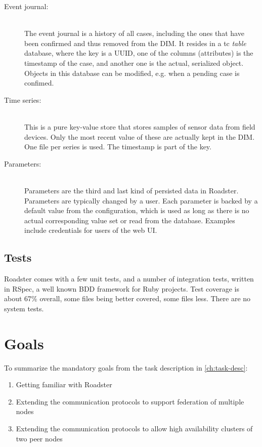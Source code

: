 \begin{description}
	\item [ Event journal: ] \hfill\\
		The event journal is a history of all \glspl{case}, including the ones
		that have been confirmed and thus removed from the DIM. It
		resides in a \gls{tc} \emph{table} database, where the key is a
		\acrshort{UUID}, one of the columns (attributes) is the timestamp of
		the case, and another one is the actual, serialized 
		object. Objects in this database can be modified, e.g. when a
		pending case is confimed.

	\item [ Time series: ] \hfill\\
		This is a pure key-value store that stores samples of sensor
		data from field devices. Only the most recent value of these
		are actually kept in the DIM. One file per series is used. The
		timestamp is part of the key.

	\item [ Parameters: ] \hfill\\
		Parameters are the third and last kind of persisted data in
		Roadster. Parameters are typically changed by a user. Each
		parameter is backed by a default value from the configuration,
		which is used as long as there is no actual corresponding value
		set or read from the database. Examples include credentials for
		users of the web UI.
\end{description}


\subsection{Tests}
Roadster comes with a few unit tests, and a number of integration tests,
written in RSpec, a well known \gls{BDD} framework for Ruby projects. Test coverage is
about 67\% overall, some files being better covered, some files less. There are
no system tests.

\section{Goals}\label{sec:scope:goals}
To summarize the mandatory goals from the task description in \autoref{ch:task-desc}:

\begin{enumerate}
	\item Getting familiar with Roadster
	\item Extending the communication protocols to support federation of
		multiple nodes
	\item Extending the communication protocols to allow high availability
		clusters of two peer nodes
\end{enumerate}

